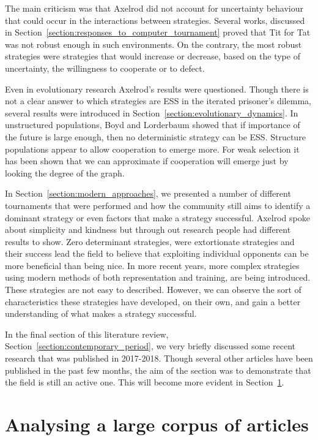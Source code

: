 \documentclass{article}
\theoremstyle{definition}
\begin{document}
The main criticism was that Axelrod did not account for uncertainty behaviour that
could occur in the interactions between strategies. Several works, discussed
in Section~\ref{section:responses_to_computer_tournament} proved that
Tit for Tat was not robust enough in such environments. On the contrary, the
most robust strategies were strategies that would  increase or decrease, based on
the type of uncertainty, the willingness to cooperate or to defect.

Even in evolutionary research Axelrod's results were questioned. Though there is
not a clear answer to which strategies are ESS in the iterated prisoner's dilemma,
several results were introduced in Section~\ref{section:evolutionary_dynamics}.
In unstructured populations, Boyd and Lorderbaum showed that if importance of the
future is large enough, then no deterministic strategy can be ESS. Structure
populations appear to allow cooperation to emerge more. For weak selection it has
been shown that we can approximate if cooperation will emerge just by looking
the degree of the graph.

In Section~\ref{section:modern_approaches}, we presented a number of different
tournaments that were performed and how the community still aims to identify a
dominant strategy or even factors that make a strategy successful. Axelrod spoke
about simplicity and kindness but through out research people had different
results to show. Zero determinant strategies, were extortionate strategies and
their success lead the field to believe that exploiting individual opponents can
be more beneficial than being nice. In more recent years, more complex strategies
using modern methods of both representation and training, are being introduced.
These strategies are not easy to described. However, we can observe the sort
of characteristics these strategies have developed, on their own, and gain
a better understanding of what makes a strategy successful.

In the final section of this literature review, Section~\ref{section:contemporary_period},
we very briefly discussed some recent research that was published in 2017-2018.
Though several other articles have been published in the past few months, the aim of the
section was to demonstrate that the field is still an active one. This will become
more evident in Section~\ref{section:analysis}.

\section{Analysing a large corpus of articles}\label{section:analysis}
\end{document}
